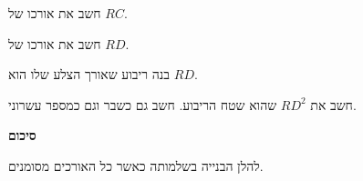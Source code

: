 \begin{exercise}
חשב את אורכו של
$RC$.
\end{exercise}

\begin{exercise}
חשב את אורכו של
$RD$.

\end{exercise}

\begin{exercise}
בנה ריבוע שאורך הצלע שלו הוא
$RD$.
\end{exercise}

\begin{exercise}
חשב את
$RD^2$
שהוא שטח הריבוע. חשב גם כשבר וגם כמספר עשרוני.
\end{exercise}

\np


\begin{center}
\textbf{\Large סיכום}
\end{center}

להלן הבנייה בשלמותה כאשר כל האורכים מסומנים.

\bigskip

